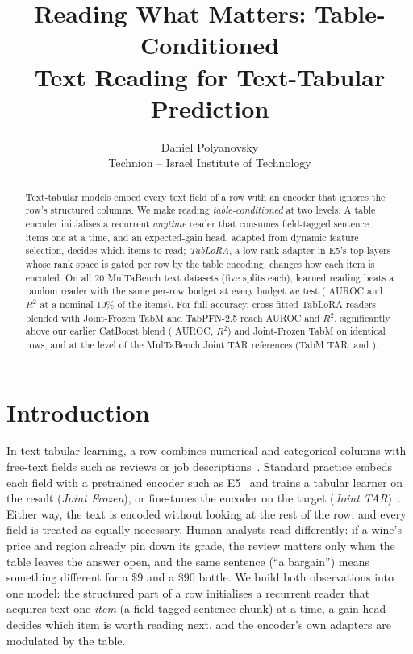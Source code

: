 \documentclass{article}
\title{Reading What Matters: Table-Conditioned\\Text Reading for Text-Tabular Prediction}
\author{Daniel Polyanovsky\\Technion -- Israel Institute of Technology}
\begin{document}
\maketitle

\begin{abstract}
Text-tabular models embed every text field of a row with an encoder that ignores the row's structured columns.
We make reading \emph{table-conditioned} at two levels.
A table encoder initialises a recurrent \emph{anytime} reader that consumes field-tagged sentence items one at a time, and an expected-gain head, adapted from dynamic feature selection, decides which items to read; \emph{TabLoRA}, a low-rank adapter in E5's top layers whose rank space is gated per row by the table encoding, changes how each item is encoded.
On all 20 MulTaBench text datasets (five splits each), learned reading beats a random reader with the same per-row budget at every budget we test (\gainContentTenClsDelta{} AUROC and \gainContentTenRegDelta{} $R^2$ at a nominal 10\% of the items).
For full accuracy, cross-fitted TabLoRA readers blended with Joint-Frozen TabM and TabPFN-2.5 reach \oursCls{} AUROC and \oursReg{} $R^2$, significantly above our earlier CatBoost blend (\oursVsVoneClsDelta{} AUROC, \oursVsVoneRegDelta{} $R^2$) and Joint-Frozen TabM on identical rows, and at the level of the MulTaBench Joint TAR references (TabM TAR: \tabmTarCls{} and \tabmTarReg).
\end{abstract}

\section{Introduction}

In text-tabular learning, a row combines numerical and categorical columns with free-text fields such as reviews or job descriptions~\cite{arazi2026multabench}.
Standard practice embeds each field with a pretrained encoder such as E5~\cite{wang2022e5} and trains a tabular learner on the result (\emph{Joint Frozen}), or fine-tunes the encoder on the target (\emph{Joint TAR})~\cite{arazi2025tabstar,arazi2026multabench}.
Either way, the text is encoded without looking at the rest of the row, and every field is treated as equally necessary.
Human analysts read differently: if a wine's price and region already pin down its grade, the review matters only when the table leaves the answer open, and the same sentence (``a bargain'') means something different for a \$9 and a \$90 bottle.
We build both observations into one model: the structured part of a row initialises a recurrent reader that acquires text one \emph{item} (a field-tagged sentence chunk) at a time, a gain head decides which item is worth reading next, and the encoder's own adapters are modulated by the table.
\end{document}
